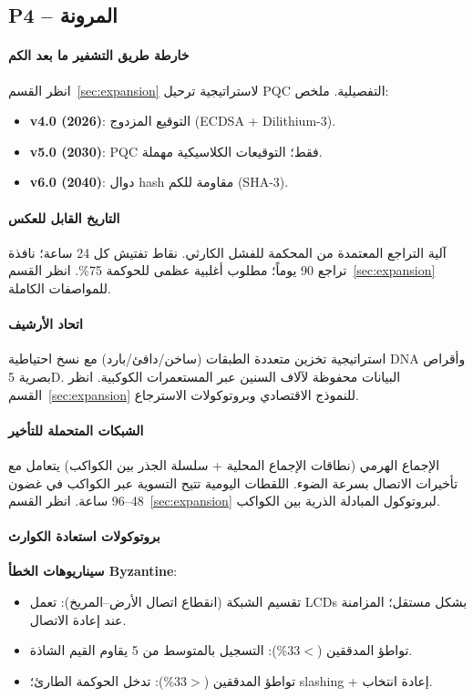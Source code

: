 \documentclass[11pt]{article}
\begin{document}
\subsection{P4 -- المرونة}
\label{sec:pillar-resilience}

\paragraph{خارطة طريق التشفير ما بعد الكم}
انظر القسم~\ref{sec:expansion} لاستراتيجية ترحيل PQC التفصيلية. ملخص:
\begin{itemize}[noitemsep]
  \item \textbf{v4.0 (2026)}: التوقيع المزدوج (ECDSA + Dilithium-3).
  \item \textbf{v5.0 (2030)}: PQC فقط؛ التوقيعات الكلاسيكية مهملة.
  \item \textbf{v6.0 (2040)}: دوال hash مقاومة للكم (SHA-3).
\end{itemize}

\paragraph{التاريخ القابل للعكس}
آلية التراجع المعتمدة من المحكمة للفشل الكارثي. نقاط تفتيش كل 24 ساعة؛ نافذة تراجع 90 يوماً؛ مطلوب أغلبية عظمى للحوكمة 75\%. انظر القسم~\ref{sec:expansion} للمواصفات الكاملة.

\paragraph{اتحاد الأرشيف}
استراتيجية تخزين متعددة الطبقات (ساخن/دافئ/بارد) مع نسخ احتياطية DNA وأقراص بصرية 5D. البيانات محفوظة لآلاف السنين عبر المستعمرات الكوكبية. انظر القسم~\ref{sec:expansion} للنموذج الاقتصادي وبروتوكولات الاسترجاع.

\paragraph{الشبكات المتحملة للتأخير}
الإجماع الهرمي (نطاقات الإجماع المحلية + سلسلة الجذر بين الكواكب) يتعامل مع تأخيرات الاتصال بسرعة الضوء. اللقطات اليومية تتيح التسوية عبر الكواكب في غضون 48--96 ساعة. انظر القسم~\ref{sec:expansion} لبروتوكول المبادلة الذرية بين الكواكب.

\paragraph{بروتوكولات استعادة الكوارث}
\textbf{سيناريوهات الخطأ Byzantine}:
\begin{itemize}[noitemsep]
  \item تقسيم الشبكة (انقطاع اتصال الأرض--المريخ): تعمل LCDs بشكل مستقل؛ المزامنة عند إعادة الاتصال.
  \item تواطؤ المدققين ($<$33\%): التسجيل بالمتوسط من 5 يقاوم القيم الشاذة.
  \item تواطؤ المدققين ($>$33\%): تدخل الحوكمة الطارئ؛ slashing + إعادة انتخاب.
\end{itemize}
\end{document}
